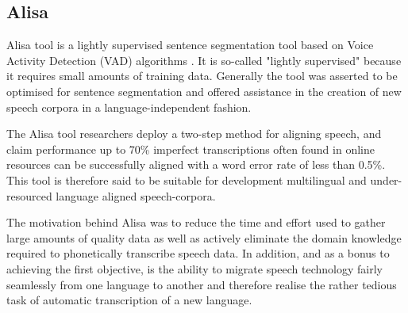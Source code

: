 \subsection{Alisa}\label{sec_c3_alisa}
Alisa tool is a lightly supervised sentence segmentation tool based on Voice Activity Detection (VAD) algorithms \citep{stan2016alisa}.  It is so-called "lightly supervised" because it requires small amounts of training data.  Generally the tool was asserted to be optimised for sentence segmentation and offered assistance in the creation of new speech corpora in a language-independent fashion. 

The Alisa tool researchers deploy a two-step method for aligning speech, and claim performance up to 70\% imperfect transcriptions often found in online resources can be successfully aligned with a word error rate of less than 0.5\%.  This tool is therefore said to be suitable for development multilingual and under-resourced language aligned speech-corpora.

The motivation behind Alisa was to reduce the time and effort used to gather large amounts of quality data as well as actively eliminate the domain knowledge required to phonetically transcribe speech data.  In addition, and as a bonus to achieving the first objective, is the ability to migrate speech technology fairly seamlessly from one language to another and therefore realise the rather tedious task of automatic transcription of a new language.

